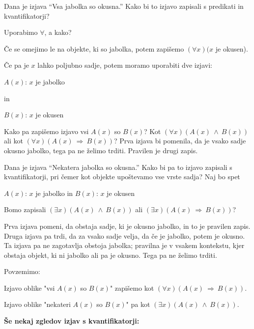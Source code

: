 \documentclass[11pt,paper=b5,DIV=13,headinclude,footinclude]{scrbook}
\newcounter{example}
\def\inn {{~\wedge~}}
\def\sledi {{~\Rightarrow~}}
\begin{document}
\medskip
\begin{sloppypar}
\begin{example*}
Dana je izjava ``Vsa jabolka so okusna.''
Kako bi to izjavo zapisali s predikati in kvantifikatorji?

Uporabimo $\forall$, a kako?

Če se omejimo le na objekte, ki so jabolka, potem zapišemo $(\forall x)(x$ je okusen).

Če pa je $x$ lahko poljubno sadje, potem moramo uporabiti dve izjavi:

$A(x)$: $x$ je jabolko

 in

$B(x)$: $x$ je okusen

Kako pa zapišemo izjavo vsi $A(x)$ so $B(x)$? Kot $(\forall x)(A(x)\inn B(x))$
ali kot $(\forall x)(A(x) \sledi B(x))$?
Prva izjava bi pomenila, da je vsako sadje okusno jabolko, tega pa ne želimo trditi. Pravilen je drugi zapis.
\end{example*}
\end{sloppypar}

\medskip
\begin{example*}
Dana je izjava ``Nekatera jabolka so okusna.'' Kako bi pa to izjavo zapisali s kvantifikatorji, pri čemer kot objekte upoštevamo vse vrste sadja?
Naj bo spet

$A(x)$: $x$ je jabolko
 in
$B(x)$: $x$ je okusen

Bomo zapisali $(\exists x)(A(x)\inn B(x))$ ali $(\exists x)(A(x) \sledi B(x))$?

Prva izjava pomeni, da obstaja sadje, ki je okusno jabolko, in to je pravilen zapis.
Druga izjava pa trdi, da za vsako sadje velja, da če je jabolko, potem je okusno. Ta izjava pa ne zagotavlja obstoja jabolka;
pravilna je v vsakem kontekstu, kjer obstaja objekt, ki ni jabolko ali pa je okusno. Tega pa ne želimo trditi.
\end{example*}

\medskip
Povzemimo:

{Izjavo oblike "vsi $A(x)$ so $B(x)$" zapišemo kot $(\forall x)(A(x)\sledi B(x))$.

Izjavo oblike "nekateri $A(x)$ so $B(x)$" pa kot $(\exists x)(A(x)\inn B(x))$.}

\medskip

\medskip
\noindent\textbf{ Še nekaj zgledov izjav s kvantifikatorji:}
\end{document}
